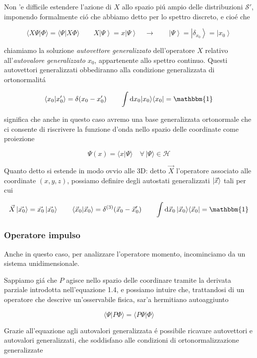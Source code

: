 \begin{enumerate}
Non 'e difficile estendere l'azione di $X$ allo spazio pi\'u ampio delle distribuzioni $\mathcal{S}'$, imponendo formalmente ci\'o che abbiamo detto per lo spettro discreto, e cio\'e che

$$\langle X\Psi|\Phi\rangle=\langle\Psi|X\Phi\rangle \qquad X\left|\Psi\right\rangle=x\left|\Psi\right\rangle\quad\longrightarrow \qquad\left|\Psi\right\rangle=\left|\delta_{x_{0}}\right\rangle=\left|x_{0}\right\rangle$$

chiamiamo la soluzione \textit{autovettore generalizzato} dell'operatore $X$ relativo all'\textit{autovalore generalizzato} $x_0$, appartenente allo spettro continuo. Questi autovettori generalizzati obbediranno alla condizione generalizzata di ortonormalit\'a

$$\langle x_{0}|x_{0}^{\prime}\rangle=\delta(x_{0}-x_{0}^{\prime}) \qquad \int \mathrm{d}x_0 \ket{x_0}\bra{x_0} = \mathbbm{1}$$

significa che anche in questo caso avremo una base generalizzata ortonormale che ci consente di riscrivere la funzione d'onda nello spazio delle coordinate come proiezione

$$\Psi(x)=\langle x|\Psi\rangle\quad\forall\,|\Psi\rangle\in{\mathcal{H}}$$

Quanto detto si estende in modo ovvio alle 3D: detto $\vec{X}$ l'operatore associato alle coordinate $(x, y, z)$, possiamo definire degli autostati generalizzati $\normalsize| \vec{x} \normalsize\rangle$ tali per cui

$${\vec{X}}\left|{\vec{x_{0}}}\right\rangle={\vec{x_{0}}}\left|{\vec{x_{0}}}\right\rangle
\qquad \langle\vec{x}_{0}|\vec{x}_{0}\rangle=\delta^{(3)}(\vec{x}_{0}-\vec{x}_{0}^{\prime}) \qquad \int\mathrm{d}\vec{x}_{0}\,|\vec{x}_{0}\rangle\langle\vec{x}_{0}|=\mathbbm{1}$$
	
	
\subsubsection{Operatore impulso}
	
Anche in questo caso, per analizzare l'operatore momento, incominciamo da un sistema unidimensionale.

Sappiamo gi\'a che $P$ agisce nello spazio delle coordinare tramite la derivata parziale introdotta nell'equazione 1.4, e possiamo intuire che, trattandosi di un operatore che descrive un'osservabile fisica, sar'a hermitiano autoaggiunto

$$\langle\Psi|P\Phi\rangle=\langle P\Psi|\Phi\rangle$$

Grazie all'equazione agli autovalori generalizzata \'e possibile ricavare autovettori e autovalori generalizzati, che soddisfano alle condizioni di ortonormalizzazione generalizzate


\end{enumerate}
